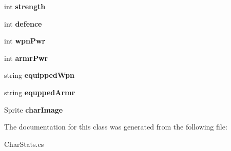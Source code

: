 \begin{DoxyCompactItemize}
\item 
\mbox{\label{class_char_stats_a9fffd9b19acd1d9c8bd6d561407bb12d}} 
int {\bfseries strength}
\item 
\mbox{\label{class_char_stats_a8c00c5a57b9cc900875dc017b8858386}} 
int {\bfseries defence}
\item 
\mbox{\label{class_char_stats_a80aa53b5e5982118a5d2530bfa58f9d5}} 
int {\bfseries wpn\+Pwr}
\item 
\mbox{\label{class_char_stats_a70972f4c6966f24e07047e46c1e56d61}} 
int {\bfseries armr\+Pwr}
\item 
\mbox{\label{class_char_stats_a9202de78bfca904b13ed10646912b866}} 
string {\bfseries equipped\+Wpn}
\item 
\mbox{\label{class_char_stats_aade057b34fa2392f0616c2249ae0e6f8}} 
string {\bfseries equpped\+Armr}
\item 
\mbox{\label{class_char_stats_af177efc9fa9f034d0394d5eb6be3f91b}} 
Sprite {\bfseries char\+Image}
\end{DoxyCompactItemize}


The documentation for this class was generated from the following file\+:\begin{DoxyCompactItemize}
\item 
Char\+Stats.\+cs\end{DoxyCompactItemize}
